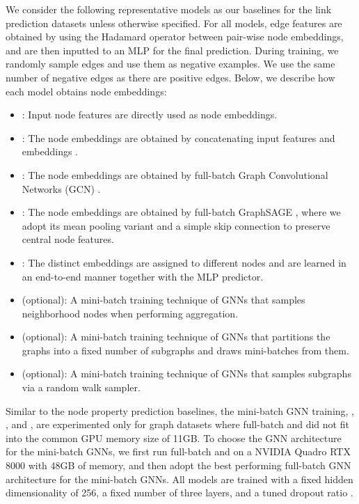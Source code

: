 We consider the following representative models as our baselines for the link prediction datasets unless otherwise specified. For all models, edge features are obtained by using the Hadamard operator  between pair-wise node embeddings, and are then inputted to an \textsc{MLP} for the final prediction. During training, we randomly sample edges and use them as negative examples. We use the same number of negative edges as there are positive edges.
Below, we describe how each model obtains node embeddings:
\begin{itemize}
  \setlength{\parskip}{0cm}
  \setlength{\itemsep}{0cm}
    \item : Input node features are directly used as node embeddings. 
    \item : The node embeddings are obtained by concatenating input features and  embeddings \citep{grover2016node2vec,perozzi2014deepwalk}.
    \item : The node embeddings are obtained by full-batch Graph Convolutional Networks (GCN) \citep{kipf2016semi}. 
    \item : The node embeddings are obtained by full-batch GraphSAGE \citep{hamilton2017inductive}, where we adopt its mean pooling variant and a simple skip connection to preserve central node features.
    \item : The distinct embeddings are assigned to different nodes and are learned in an end-to-end manner together with the MLP predictor.
        \item  (optional): A mini-batch training technique of GNNs \citep{hamilton2017inductive} that samples neighborhood nodes when performing aggregation.
     \item  (optional): A mini-batch training technique of GNNs \citep{chiang2019cluster} that partitions the graphs into a fixed number of subgraphs and draws mini-batches from them.
    \item  (optional): A mini-batch training technique of GNNs \citep{zeng2019graphsaint} that samples subgraphs via a random walk sampler.
\end{itemize}
Similar to the node property prediction baselines, the mini-batch GNN training, , , and , are experimented only for graph datasets where full-batch  and  did not fit into the common GPU memory size of 11GB.
To choose the GNN architecture for the mini-batch GNNs, we first run full-batch  and  on a NVIDIA Quadro RTX 8000 with 48GB of memory, and then adopt the best performing full-batch GNN architecture for the mini-batch GNNs.
All models are trained with a fixed hidden dimensionality of 256, a fixed number of three layers, and a tuned dropout ratio .

